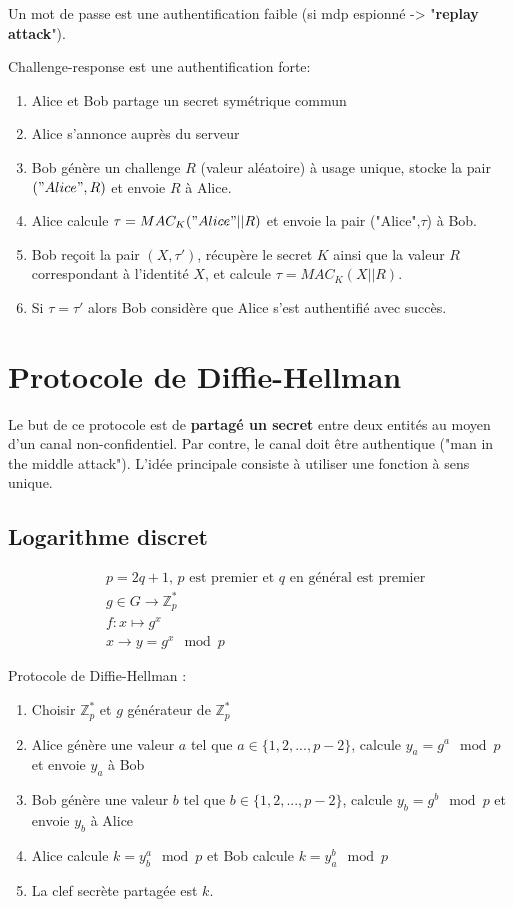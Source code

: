\documentclass[11pt,a4paper]{report}
\begin{document}
Un mot de passe est une authentification faible (si mdp espionné -> "\textbf{replay attack}").

Challenge-response est une authentification forte:
\begin{enumerate}
    \item Alice et Bob partage un secret symétrique commun
    \item Alice s'annonce auprès du serveur
    \item Bob génère un challenge $R$ (valeur aléatoire) à usage unique, stocke la pair $("Alice",R)$ et envoie $R$ à Alice.
    \item Alice calcule $\tau = MAC_K("Alice"||R)$ et envoie la pair ("Alice",$\tau$) à Bob.
    \item Bob reçoit la pair $(X,\tau')$, récupère le secret $K$ ainsi que la valeur $R$ correspondant à l'identité $X$, et calcule $\tau = MAC_K(X||R)$.
    \item Si $\tau=\tau'$ alors Bob considère que Alice s'est authentifié avec succès.
\end{enumerate}

\section{Protocole de Diffie-Hellman}

Le but de ce protocole est de \textbf{partagé un secret} entre deux entités au moyen d'un canal non-confidentiel. Par contre, le canal doit être authentique ("man in the middle attack"). L'idée principale consiste à utiliser une fonction à sens unique.

\subsection{Logarithme discret}
\begin{align*}
& p = 2q + 1 \text{, $p$ est premier et $q$ en général est premier}\\
& g \in G \rightarrow \mathbb{Z}^*_p \\
& f : x \mapsto g^x \\
& x \longrightarrow y = g^x \mod p
\end{align*}

Protocole de Diffie-Hellman :
\begin{enumerate}
    \item Choisir $\mathbb{Z}^*_p$ et $g$ générateur de $\mathbb{Z}^*_p$
    \item Alice génère une valeur $a$ tel que $a\in\{1,2,...,p-2\}$, calcule $y_a=g^a\mod p$ et envoie $y_a$ à Bob
    \item Bob génère une valeur $b$ tel que $b\in\{1,2,...,p-2\}$,  calcule $y_b=g^b\mod p$ et envoie $y_b$ à Alice
    \item Alice calcule $k=y^a_b\mod p$ et Bob calcule $k=y^b_a \mod p$
    \item La clef secrète partagée est $k$.
\end{enumerate}
\end{document}
